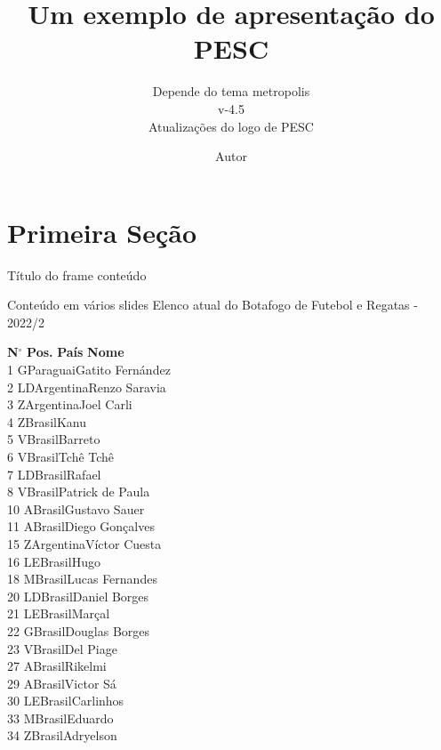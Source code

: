 \documentclass[aspectratio=169]{beamer}
\title[exemplo de apresentação]{Um exemplo de apresentação do PESC}
\subtitle{Depende do tema metropolis \\ v-4.5 \\ Atualizações do logo de PESC}
\author{Autor}
\begin{document}
\maketitle
\section{Primeira Seção}


	
\begin{frame}{Título do frame}
	conteúdo
\end{frame}

\begin{frame}[allowframebreaks]{Conteúdo em vários slides}
\large Elenco atual do Botafogo de Futebol e Regatas - 2022/2 \\

\begin{tabbing}
\textbf{N}$^\circ$	    \= \textbf{Pos.}	\=\textbf{País} \hspace{3em }\=\textbf{Nome} \\
1 \>G\>Paraguai\>Gatito Fernández \\
2 \>LD\>Argentina\>Renzo Saravia	\\
3 \>Z\>Argentina\>Joel Carli \\	
4 \>Z\>Brasil\>Kanu	\\
5 \>V\>Brasil\>Barreto \\	
6 \>V\>Brasil\>Tchê Tchê\\	
7 \>LD\>Brasil\>Rafael \\
8 \>V\>Brasil\>Patrick de Paula	\\
10 \>A\>Brasil\>Gustavo Sauer \\
11	\>A\>Brasil\>Diego Gonçalves \\		
15	\>Z\>Argentina\>Víctor Cuesta	\\	
16	\>LE\>Brasil\>Hugo	\\
18	\>M\>Brasil\>Lucas Fernandes \\
20	\>LD\>Brasil\>Daniel Borges \\
21	\>LE\>Brasil\>Marçal \\
22	\>G\>Brasil\>Douglas Borges \\
23	\>V\>Brasil\>Del Piage \\
27	\>A\>Brasil\>Rikelmi \\
29	\>A\>Brasil\>Victor Sá \\	
30	\>LE\>Brasil\>Carlinhos \\	
33	\>M\>Brasil\>Eduardo \\
34	\>Z\>Brasil\>Adryelson \\	

\end{tabbing}
\end{frame}
\end{document}
